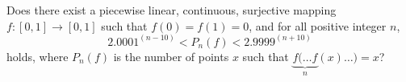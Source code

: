 Does there exist a piecewise linear, continuous, surjective mapping $f: [0,1]\to [0,1]$ such that $f(0)=f(1)=0$, and for all positive integer $n$,
$$2.0001^{(n-10)} <P_n(f)<2.9999^{(n+10)}$$holds, where $P_n(f)$ is the number of points $x$ such that $\underbrace{f(\dotsc f}_n(x)\dotsc )=x$?